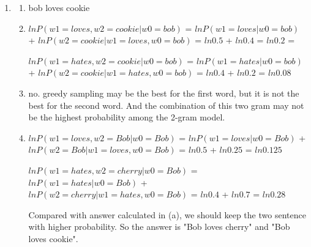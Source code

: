 \documentclass[12pt]{article}
\begin{document}
\begin{enumerate}
\item
\begin{enumerate}
\item bob loves cookie
\item 
$lnP(w1 = loves, w2 = cookie | w0 = bob)$ = $lnP(w1 = loves | w0 = bob)$ +  $lnP(w2 = cookie | w1 = loves, w0 = bob)$
= $ln0.5$ + $ln0.4$ = $ln0.2$ = 

$lnP(w1 = hates, w2 = cookie | w0 = bob)$ = $lnP(w1 = hates | w0 = bob)$ +  $lnP(w2 = cookie | w1 = hates, w0 = bob)$
= $ln0.4$ + $ln0.2$ = $ln0.08$

\item no. greedy sampling may be the best for the first word, but it is not the best for the second word. And the combination of this two gram may not be the highest probability among the 2-gram model.
\item $lnP(w1 = loves, w2 = Bob | w0 = Bob)$ = $lnP(w1 = loves | w0 = Bob)$ +  $lnP(w2 = Bob | w1 = loves, w0 = Bob)$
 = $ln0.5$ + $ln0.25$ = $ln0.125$

$lnP(w1 = hates, w2 = cherry | w0 = Bob)$ = $lnP(w1 = hates | w0 = Bob)$ +  $lnP(w2 = cherry | w1 = hates, w0 = Bob)$
 = $ln0.4$ + $ln0.7$ = $ln0.28$

Compared with answer calculated in (a), we should keep the two sentence with higher probability. So the answer is "Bob loves cherry" and "Bob loves cookie".

\end{enumerate}


\end{enumerate}
\end{document}
